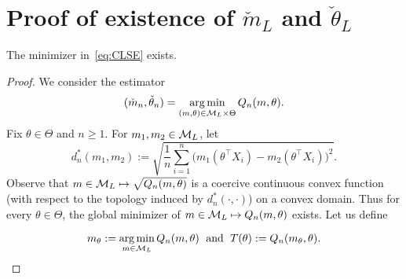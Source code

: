 

\section{Proof of existence of $\check{m}_{{L}}$ and $\check{\theta}_{{L}}$} \label{app:proof:existanceCLSE}
\begin{prop}\label{thm:existanceCLSE}
The minimizer in~\eqref{eq:CLSE} exists.
\end{prop}
\begin{proof}


We consider the estimator
\[
(\check{m}_n, \check{\theta}_n) = \operatorname*{arg\,min}_{(m,\theta)\in \mathcal{M}_{L}\times \Theta}Q_n(m, \theta).
\]
Fix $\theta\in \Theta$ and $n\ge 1$. For $m_1, m_2\in \mathcal{M}_L$, let 
\[d^*_n(m_1, m_2) := \sqrt{\frac{1}{n}\sum_{i=1}^n \big(m_1(\theta^\top X_i) -m_2(\theta^\top X_i)\big)^2}.
\] Observe that  $m \in \mathcal{M}_L \mapsto \sqrt{Q_n(m, \theta)}$ is a coercive continuous convex function (with respect to the topology induced by $d^*_n(\cdot, \cdot)$) on a convex domain.
Thus for every $\theta\in \Theta$, the global minimizer of $m \in \mathcal{M}_L \mapsto Q_n(m, \theta)$ exists. Let us define

  \begin{equation}\label{eq:t_theta_def}
  m_{\theta}:= \operatorname*{arg\,min}_{m\in\mathcal{M}_L}Q_n(m,\theta)\;\text{ and }\; T(\theta) :=Q_n(m_\theta,\theta).
  \end{equation}



\end{proof}
